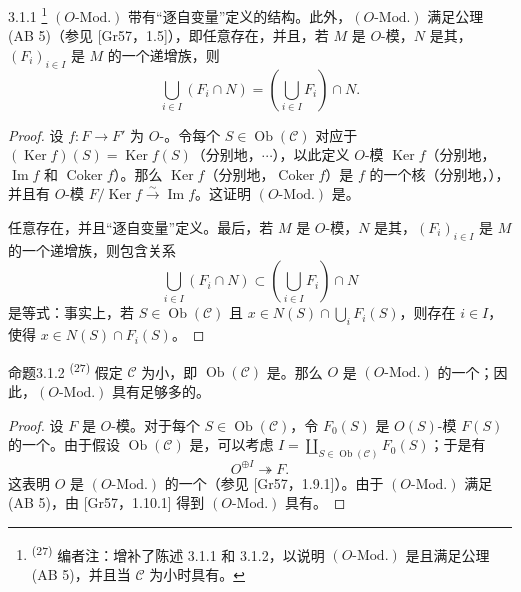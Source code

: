 \begin{SGAresult}{}{3.1.1}
\footnote{\textsuperscript{(27)} 编者注：增补了陈述 3.1.1 和 3.1.2，以说明 $(O\text{-}\mathrm{Mod.})$ 是且满足公理 (AB 5)，并且当 $\mathcal C$ 为小时具有。}
$(O\text{-}\mathrm{Mod.})$ 带有“逐自变量”定义的结构。此外，$(O\text{-}\mathrm{Mod.})$ 满足公理 (AB 5)（参见 [Gr57，1.5]），即任意存在，并且，若 $M$ 是 $O$-模，$N$ 是其，$(F_i)_{i\in I}$ 是 $M$ 的一个递增族，则
\[
\bigcup_{i\in I}(F_i\cap N)=\left(\bigcup_{i\in I}F_i\right)\cap N.
\]
\end{SGAresult}
\begin{proof}
设 $f:F\to F'$ 为 $O$-。令每个 $S\in\operatorname{Ob}(\mathcal C)$ 对应于 $(\operatorname{Ker}f)(S)=\operatorname{Ker}f(S)$（分别地，$\cdots$），以此定义 $O$-模 $\operatorname{Ker}f$（分别地，$\operatorname{Im}f$ 和 $\operatorname{Coker}f$）。那么 $\operatorname{Ker}f$（分别地，$\operatorname{Coker}f$）是 $f$ 的一个核（分别地，），并且有 $O$-模 $F/\operatorname{Ker}f\xrightarrow{\sim}\operatorname{Im}f$。这证明 $(O\text{-}\mathrm{Mod.})$ 是。

任意存在，并且“逐自变量”定义。最后，若 $M$ 是 $O$-模，$N$ 是其，$(F_i)_{i\in I}$ 是 $M$ 的一个递增族，则包含关系
\[
\bigcup_{i\in I}(F_i\cap N)\subset\left(\bigcup_{i\in I}F_i\right)\cap N
\]
是等式：事实上，若 $S\in\operatorname{Ob}(\mathcal C)$ 且 $x\in N(S)\cap\bigcup_iF_i(S)$，则存在 $i\in I$，使得 $x\in N(S)\cap F_i(S)$。
\end{proof}
\begin{SGAresult}{命题}{3.1.2}
\textsuperscript{(27)} 假定 $\mathcal C$ 为小，即 $\operatorname{Ob}(\mathcal C)$ 是。那么 $O$ 是 $(O\text{-}\mathrm{Mod.})$ 的一个；因此，$(O\text{-}\mathrm{Mod.})$ 具有足够多的。
\end{SGAresult}
\begin{proof}
设 $F$ 是 $O$-模。对于每个 $S\in\operatorname{Ob}(\mathcal C)$，令 $F_0(S)$ 是 $O(S)$-模 $F(S)$ 的一个。由于假设 $\operatorname{Ob}(\mathcal C)$ 是，可以考虑 $I=\coprod_{S\in\operatorname{Ob}(\mathcal C)}F_0(S)$；于是有
\[
O^{\oplus I}\twoheadrightarrow F.
\]
这表明 $O$ 是 $(O\text{-}\mathrm{Mod.})$ 的一个（参见 [Gr57，1.9.1]）。由于 $(O\text{-}\mathrm{Mod.})$ 满足 (AB 5)，由 [Gr57，1.10.1] 得到 $(O\text{-}\mathrm{Mod.})$ 具有。
\end{proof}
